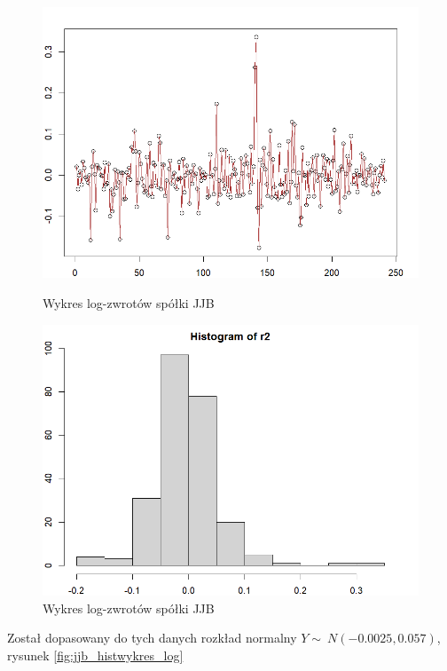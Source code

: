 \documentclass[a4paper,11pt]{article}
\begin{document}
\begin{figure}[!htb]
    \begin{minipage}{.45\textwidth}
        \centering
        \includegraphics[width=\linewidth]{images/jjb_wykres_log.png}
        \caption{Wykres log-zwrotów spółki JJB}
        \label{fig:jjb_wykres_log}
    \end{minipage}\hspace{0.1\textwidth}%
    \begin{minipage}{.45\textwidth}
        \centering
        \includegraphics[width=\linewidth]{images/jjb_hist_log.png}
        \caption{Wykres log-zwrotów spółki JJB}
        \label{fig:jjb_hist_log}
    \end{minipage}
\end{figure}

Został dopasowany do tych danych rozkład normalny $Y \sim\ N(-0.0025,0.057 )$, rysunek \ref{fig:jjb_histwykres_log}
\end{document}
